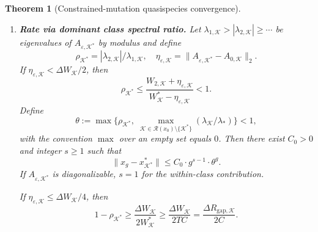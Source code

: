 \documentclass[12pt]{article}
\newtheorem{theorem}{Theorem}[section]
\begin{document}
\begin{theorem}[Constrained-mutation quasispecies convergence]
\begin{enumerate}[label=(\alph*)]
\item \textbf{Rate via dominant class spectral ratio.} Let $\lambda_{1,\mathcal{K}} > |\lambda_{2,\mathcal{K}}| \ge \cdots$ be eigenvalues of $A_{\varepsilon,\mathcal{K}^*}$ by modulus and define
\[
\rho_{\mathcal{K}^*} = |\lambda_{2,\mathcal{K}}|/\lambda_{1,\mathcal{K}}, \quad \eta_{\varepsilon,\mathcal{K}} = \|A_{\varepsilon,\mathcal{K}^*} - A_{0,\mathcal{K}}\|_2.
\]
If $\eta_{\varepsilon,\mathcal{K}} < \Delta W_\mathcal{K}/2$, then
\begin{equation}\label{eq:spectral-ratio}
\rho_{\mathcal{K}^*} \le \frac{W_{2,\mathcal{K}} + \eta_{\varepsilon,\mathcal{K}}}{W^*_\mathcal{K} - \eta_{\varepsilon,\mathcal{K}}} < 1.
\end{equation}
Define
\begin{equation}\label{eq:theta}
\theta := \max\!\bigl\{\rho_{\mathcal{K}^*},\; \max_{\mathcal{K} \in \mathcal{R}(x_0) \setminus \{\mathcal{K}^*\}} (\lambda_\mathcal{K}/\lambda_*)\bigr\} < 1,
\end{equation}
with the convention $\max$ over an empty set equals $0$. Then there exist $C_0 > 0$ and integer $s \ge 1$ such that
\begin{equation}\label{eq:convergence-rate}
\|x_g - x^*_{\mathcal{K}^*}\| \le C_0 \cdot g^{s-1} \cdot \theta^g.
\end{equation}
If $A_{\varepsilon,\mathcal{K}^*}$ is diagonalizable, $s = 1$ for the within-class contribution.

If $\eta_{\varepsilon,\mathcal{K}} \le \Delta W_\mathcal{K}/4$, then
\begin{equation}\label{eq:gap-bound}
1 - \rho_{\mathcal{K}^*} \ge \frac{\Delta W_\mathcal{K}}{2 W^*_\mathcal{K}} \ge \frac{\Delta W_\mathcal{K}}{2TC} = \frac{\Delta R_{\mathrm{gap},\mathcal{K}}}{2C}.
\end{equation}
\end{enumerate}
\end{theorem}
\end{document}
